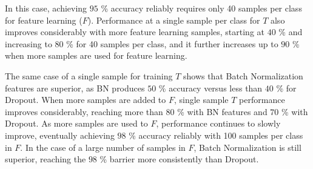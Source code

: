 In this case, achieving $95$ \% accuracy reliably requires only 40 samples per class for feature learning ($F$). Performance at a single sample per class for $T$ also improves considerably with more feature learning samples, starting at $40$ \% and increasing to $80$ \% for 40 samples per class, and it further increases up to $90$ \% when more samples are used for feature learning.

The same case of a single sample for training $T$ shows that Batch Normalization features are superior, as BN produces $50$ \% accuracy versus less than $40$ \% for Dropout. When more samples are added to $F$, single sample $T$ performance improves considerably, reaching more than $80$ \% with BN features and $70$ \% with Dropout. As more samples are used to $F$, performance continues to slowly improve, eventually achieving $98$ \% accuracy reliably with 100 samples per class in $F$. In the case of a large number of samples in $F$, Batch Normalization is still superior, reaching the $98$ \% barrier more consistently than Dropout.

